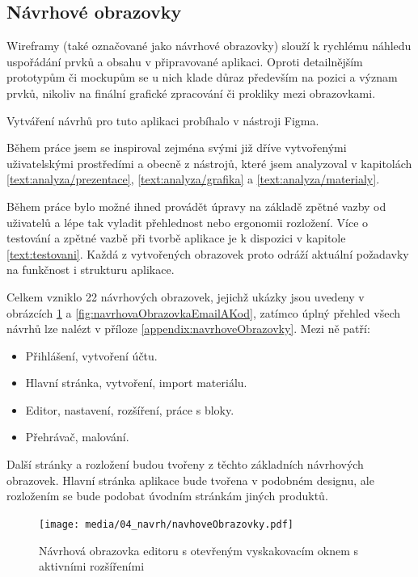 \subsection{Návrhové obrazovky}

Wireframy (také označované jako návrhové obrazovky) slouží k rychlému náhledu uspořádání prvků a obsahu v připravované aplikaci. 
Oproti detailnějším prototypům či mockupům se u nich klade důraz především na pozici a význam prvků, nikoliv na finální grafické zpracování či prokliky mezi obrazovkami.

Vytváření návrhů pro tuto aplikaci probíhalo v nástroji Figma. 

Během práce jsem se inspiroval zejména svými již dříve vytvořenými uživatelskými prostředími a obecně z nástrojů, které jsem analyzoval v kapitolách \ref{text:analyza/prezentace}, \ref{text:analyza/grafika} a \ref{text:analyza/materialy}.

Během práce bylo možné ihned provádět úpravy na základě zpětné vazby od uživatelů a lépe tak vyladit přehlednost nebo ergonomii rozložení. 
Více o testování a zpětné vazbě při tvorbě aplikace je k dispozici v kapitole \ref{text:testovani}.
Každá z vytvořených obrazovek proto odráží aktuální požadavky na funkčnost i strukturu aplikace.


Celkem vzniklo 22 návrhových obrazovek, jejichž ukázky jsou uvedeny v obrázcích \ref{fig:navrhovaObrazovkaRozsireni} a \ref{fig:navrhovaObrazovkaEmailAKod}, zatímco úplný přehled všech návrhů lze nalézt v příloze \ref{appendix:navrhoveObrazovky}.
Mezi ně patří:

\begin{itemize}
    \item Přihlášení, vytvoření účtu.
    \item Hlavní stránka, vytvoření, import materiálu.
    \item Editor, nastavení, rozšíření, práce s bloky.
    \item Přehrávač, malování.
\end{itemize}

Další stránky a rozložení budou tvořeny z těchto základních návrhových obrazovek.
Hlavní stránka aplikace bude tvořena v podobném designu, ale rozložením se bude podobat úvodním stránkám jiných produktů.

\begin{figure}[ht!]
    \centering
    \texttt{[image: media/04\_navrh/navhoveObrazovky.pdf]}
    \caption{Návrhová obrazovka editoru s otevřeným vyskakovacím oknem s aktivními rozšířeními}\label{fig:navrhovaObrazovkaRozsireni}
\end{figure}

